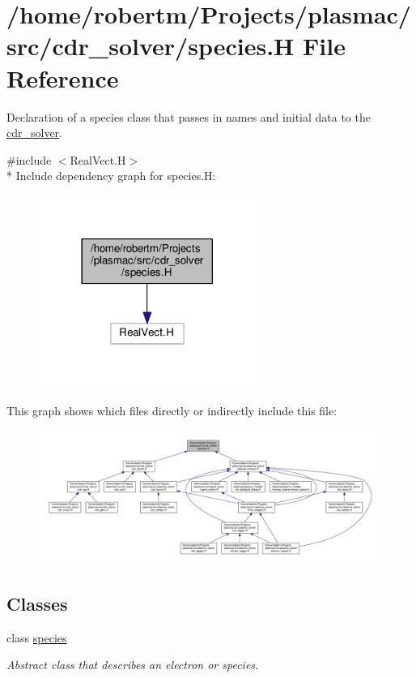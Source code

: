\hypertarget{species_8H}{}\section{/home/robertm/\+Projects/plasmac/src/cdr\+\_\+solver/species.H File Reference}
\label{species_8H}


Declaration of a species class that passes in names and initial data to the \hyperlink{classcdr__solver}{cdr\+\_\+solver}.  


{\ttfamily \#include $<$Real\+Vect.\+H$>$}\\*
Include dependency graph for species.\+H\+:\nopagebreak
\begin{figure}[H]
\begin{center}
\leavevmode
\includegraphics[width=201pt]{species_8H__incl}
\end{center}
\end{figure}
This graph shows which files directly or indirectly include this file\+:\nopagebreak
\begin{figure}[H]
\begin{center}
\leavevmode
\includegraphics[width=350pt]{species_8H__dep__incl}
\end{center}
\end{figure}
\subsection*{Classes}
\begin{DoxyCompactItemize}
\item 
class \hyperlink{classspecies}{species}
\begin{DoxyCompactList}\small\item\em Abstract class that describes an electron or species. \end{DoxyCompactList}\end{DoxyCompactItemize}



